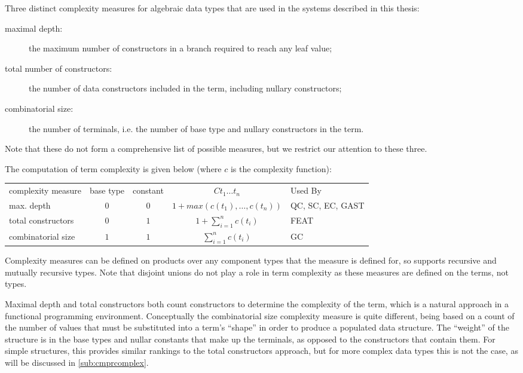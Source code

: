 \noindent
Three distinct complexity measures for algebraic data types
that are used in the \pbt systems described in this thesis:

\begin{description}
\item[maximal depth:]
the maximum number of constructors in a branch required to reach any leaf value;
\item [total number of constructors:] the number of data constructors included in the term, including nullary constructors;
\item [combinatorial size:] the number of terminals,
i.e. the number of base type and nullary constructors in the term.
\end{description}

\noindent
Note that these do not form a comprehensive list of possible measures,
but we restrict our attention to these three.

The computation of term complexity is given below (where $c$ is the complexity function):

\begin{tabular}{ l c c c l}
complexity measure & base type & constant & $C t_1 \dots t_n$ & Used By\\
max. depth & $0$ & $0$ & $1 + max ( c(t_1), \dotsc, c(t_n) )$ & QC, SC, EC, GAST\\
total constructors & $0$ & $1$ & $1 + \sum_{i=1}^{n} c(t_i)$ & FEAT\\
combinatorial size & $1$ & $1$ & $\sum_{i=1}^{n} c(t_i)$ & GC
\end{tabular}

\noindent
Complexity measures can be defined on products over any component types
that the measure is defined for,
so supports recursive and mutually recursive types.
Note that disjoint unions do not play a role in term complexity as these measures
are defined on the terms, not types.

Maximal depth and total constructors both count constructors to determine the complexity of the term,
which is a natural approach in a functional programming environment.
Conceptually the combinatorial size complexity measure is quite different,
being based on a count of the number of values
that must be substituted into a term's ``shape''
in order to produce a populated data structure.
The ``weight'' of the structure is in the base types and nullar constants that make up the terminals,
as opposed to the constructors that contain them.
For simple structures,
this provides similar rankings to the total constructors approach,
but for more complex data types this is not the case,
as will be discussed in \ref{sub:cmprcomplex}.

